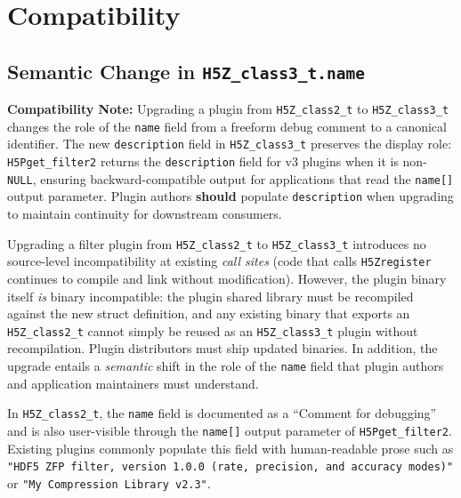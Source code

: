 \documentclass[../HDF5_RFC.tex]{subfiles}
\begin{document}
\section{Compatibility}
\label{sec:compatibility}

\subsection{Semantic Change in \texttt{H5Z\_class3\_t.name}}
\label{sec:name-semantic-change}

\noindent\colorbox{yellow!25}{\parbox{\dimexpr\linewidth-2\fboxsep}{%
  \textbf{Compatibility Note:} Upgrading a plugin from
  \texttt{H5Z\_class2\_t} to \texttt{H5Z\_class3\_t} changes the role of the
  \texttt{name} field from a freeform debug comment to a canonical identifier.
  The new \texttt{description} field in \texttt{H5Z\_class3\_t} preserves the
  display role: \texttt{H5Pget\_filter2} returns the \texttt{description} field
  for v3 plugins when it is non-\texttt{NULL}, ensuring backward-compatible
  output for applications that read the \texttt{name[]} output parameter.
  Plugin authors \textbf{should} populate \texttt{description} when upgrading
  to maintain continuity for downstream consumers.
}}\medskip

Upgrading a filter plugin from \texttt{H5Z\_class2\_t} to \texttt{H5Z\_class3\_t}
introduces no source-level incompatibility at existing \emph{call sites}
(code that calls \texttt{H5Zregister} continues to compile and link without
modification). However, the plugin binary itself \emph{is} binary incompatible:
the plugin shared library must be recompiled against the new struct definition,
and any existing binary that exports an \texttt{H5Z\_class2\_t} cannot simply be
reused as an \texttt{H5Z\_class3\_t} plugin without recompilation. Plugin
distributors must ship updated binaries. In addition, the upgrade entails a
\emph{semantic} shift in the role of the \texttt{name} field that plugin authors
and application maintainers must understand.

In \texttt{H5Z\_class2\_t}, the \texttt{name} field is documented as a ``Comment for
debugging'' and is also user-visible through the \texttt{name[]} output parameter of
\texttt{H5Pget\_filter2}. Existing plugins commonly populate this field with
human-readable prose such as \texttt{"HDF5 ZFP filter, version 1.0.0 (rate,
precision, and accuracy modes)"} or \texttt{"My Compression Library v2.3"}.
\end{document}
